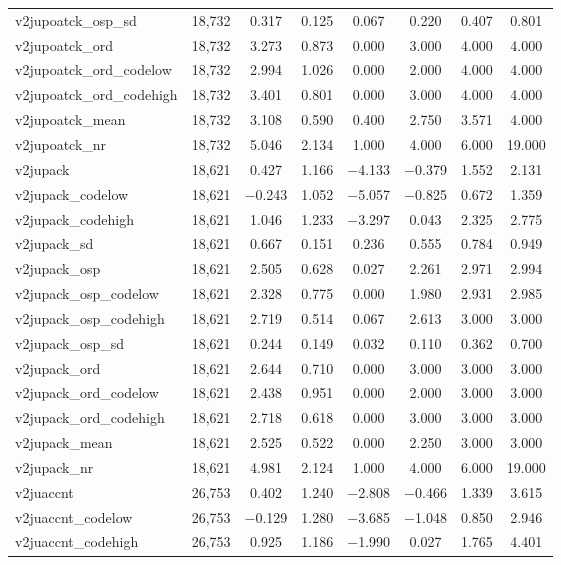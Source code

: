 \begin{table}[!htbp]
\begin{tabular}{@{\extracolsep{5pt}}lccccccc}
v2jupoatck\_osp\_sd & 18,732 & 0.317 & 0.125 & 0.067 & 0.220 & 0.407 & 0.801 \\ 
v2jupoatck\_ord & 18,732 & 3.273 & 0.873 & 0.000 & 3.000 & 4.000 & 4.000 \\ 
v2jupoatck\_ord\_codelow & 18,732 & 2.994 & 1.026 & 0.000 & 2.000 & 4.000 & 4.000 \\ 
v2jupoatck\_ord\_codehigh & 18,732 & 3.401 & 0.801 & 0.000 & 3.000 & 4.000 & 4.000 \\ 
v2jupoatck\_mean & 18,732 & 3.108 & 0.590 & 0.400 & 2.750 & 3.571 & 4.000 \\ 
v2jupoatck\_nr & 18,732 & 5.046 & 2.134 & 1.000 & 4.000 & 6.000 & 19.000 \\ 
v2jupack & 18,621 & 0.427 & 1.166 & $-$4.133 & $-$0.379 & 1.552 & 2.131 \\ 
v2jupack\_codelow & 18,621 & $-$0.243 & 1.052 & $-$5.057 & $-$0.825 & 0.672 & 1.359 \\ 
v2jupack\_codehigh & 18,621 & 1.046 & 1.233 & $-$3.297 & 0.043 & 2.325 & 2.775 \\ 
v2jupack\_sd & 18,621 & 0.667 & 0.151 & 0.236 & 0.555 & 0.784 & 0.949 \\ 
v2jupack\_osp & 18,621 & 2.505 & 0.628 & 0.027 & 2.261 & 2.971 & 2.994 \\ 
v2jupack\_osp\_codelow & 18,621 & 2.328 & 0.775 & 0.000 & 1.980 & 2.931 & 2.985 \\ 
v2jupack\_osp\_codehigh & 18,621 & 2.719 & 0.514 & 0.067 & 2.613 & 3.000 & 3.000 \\ 
v2jupack\_osp\_sd & 18,621 & 0.244 & 0.149 & 0.032 & 0.110 & 0.362 & 0.700 \\ 
v2jupack\_ord & 18,621 & 2.644 & 0.710 & 0.000 & 3.000 & 3.000 & 3.000 \\ 
v2jupack\_ord\_codelow & 18,621 & 2.438 & 0.951 & 0.000 & 2.000 & 3.000 & 3.000 \\ 
v2jupack\_ord\_codehigh & 18,621 & 2.718 & 0.618 & 0.000 & 3.000 & 3.000 & 3.000 \\ 
v2jupack\_mean & 18,621 & 2.525 & 0.522 & 0.000 & 2.250 & 3.000 & 3.000 \\ 
v2jupack\_nr & 18,621 & 4.981 & 2.124 & 1.000 & 4.000 & 6.000 & 19.000 \\ 
v2juaccnt & 26,753 & 0.402 & 1.240 & $-$2.808 & $-$0.466 & 1.339 & 3.615 \\ 
v2juaccnt\_codelow & 26,753 & $-$0.129 & 1.280 & $-$3.685 & $-$1.048 & 0.850 & 2.946 \\ 
v2juaccnt\_codehigh & 26,753 & 0.925 & 1.186 & $-$1.990 & 0.027 & 1.765 & 4.401 \\ 

\end{tabular}
\end{table}
